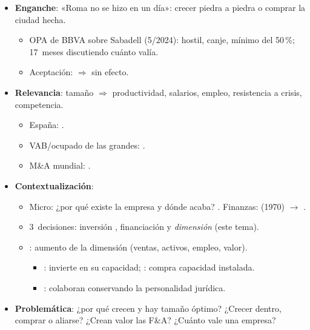 \documentclass{article}
\begin{document}
\cabecerarepaso
\begin{columnas}

\begin{itemize}
\item \textbf{Enganche}: «Roma no se hizo en un día»: crecer piedra a piedra o comprar la ciudad hecha.
  \begin{itemize}
  \item OPA de BBVA sobre Sabadell (5/2024): hostil, canje, mínimo del 50\,\%; 17~meses discutiendo cuánto valía.
  \item Aceptación:  $\Rightarrow$ sin efecto.
  \end{itemize}
\item \textbf{Relevancia}: tamaño $\Rightarrow$ productividad, salarios, empleo, resistencia a crisis, competencia.
  \begin{itemize}
  \item España: .
  \item VAB/ocupado de las grandes:  .
  \item M\&A mundial: .
  \end{itemize}
\item \textbf{Contextualización}:
  \begin{itemize}
  \item Micro: ¿por qué existe la empresa y dónde acaba? . Finanzas:  (1970) $\to$ .
  \item 3~decisiones: inversión , financiación  y \emph{dimensión} (este tema).
  \item {}: aumento de la dimensión (ventas, activos, empleo, valor).
    \begin{itemize}
    \item {}: invierte en su capacidad; : compra capacidad instalada.
    \item {}: colaboran conservando la personalidad jurídica.
    \end{itemize}
  \end{itemize}
\item \textbf{Problemática}: ¿por qué crecen y hay tamaño óptimo? ¿Crecer dentro, comprar o aliarse? ¿Crean valor las F\&A? ¿Cuánto vale una empresa?

\end{itemize}
\end{columnas}
\end{document}

